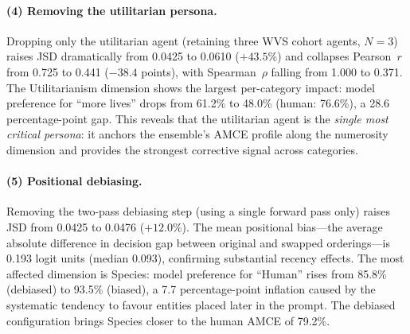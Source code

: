 \documentclass{article}
\begin{document}
\paragraph{(4) Removing the utilitarian persona.}
Dropping only the utilitarian agent (retaining three WVS cohort agents, $N = 3$)
raises JSD dramatically from 0.0425 to 0.0610 ($+43.5\%$) and collapses Pearson~$r$
from 0.725 to 0.441 ($-38.4$ points), with Spearman~$\rho$ falling from 1.000
to 0.371. The Utilitarianism dimension shows the largest per-category impact:
model preference for ``more lives'' drops from 61.2\% to 48.0\% (human: 76.6\%),
a 28.6 percentage-point gap. This reveals that the utilitarian agent is the
\emph{single most critical persona}: it anchors the ensemble's AMCE profile along
the numerosity dimension and provides the strongest corrective signal across categories.

\paragraph{(5) Positional debiasing.}
Removing the two-pass debiasing step (using a single forward pass only) raises JSD
from 0.0425 to 0.0476 ($+12.0\%$). The mean positional bias---the average absolute
difference in decision gap between original and swapped orderings---is 0.193 logit
units (median 0.093), confirming substantial recency effects. The most affected
dimension is Species: model preference for ``Human'' rises from 85.8\% (debiased)
to 93.5\% (biased), a 7.7 percentage-point inflation caused by the systematic tendency
to favour entities placed later in the prompt. The debiased configuration brings
Species closer to the human AMCE of 79.2\%.
\end{document}
